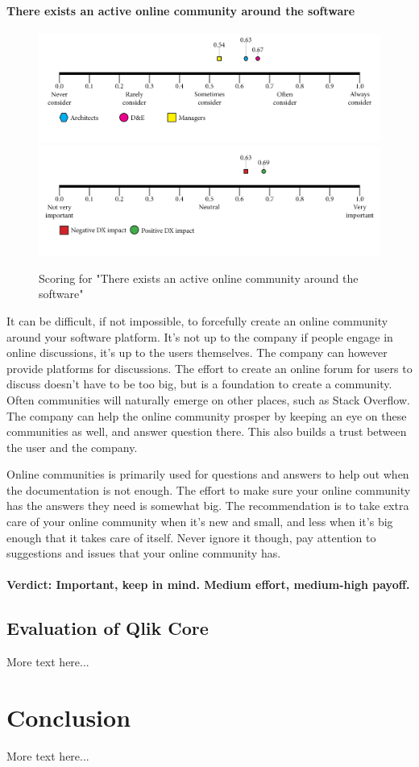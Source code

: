 \documentclass{article}
\begin{document}
\paragraph{There exists an active online community around the software}
\begin{figure}[H]
\centering
\includegraphics[width=\linewidth]{scorelines/aspect16.png}
\includegraphics[width=\linewidth]{dxscorelines/dxaspect16.png}
\caption{Scoring for "There exists an active online community around the software"}
\label{fig:aspect16}
\end{figure}
It can be difficult, if not impossible, to forcefully create an online community around your software platform. It's not up to the company if people engage in online discussions, it's up to the users themselves. The company can however provide platforms for discussions. The effort to create an online forum for users to discuss doesn't have to be too big, but is a foundation to create a community. Often communities will naturally emerge on other places, such as Stack Overflow. The company can help the online community prosper by keeping an eye on these communities as well, and answer question there. This also builds a trust between the user and the company.

Online communities is primarily used for questions and answers to help out when the documentation is not enough. The effort to make sure your online community has the answers they need is somewhat big. The recommendation is to take extra care of your online community when it's new and small, and less when it's big enough that it takes care of itself. Never ignore it though, pay attention to suggestions and issues that your online community has. \\ \\
\textbf{Verdict: Important, keep in mind. Medium effort, medium-high payoff.}
\subsection{Evaluation of Qlik Core}
More text here...
\section{Conclusion}
More text here...
\newpage


\end{document}
